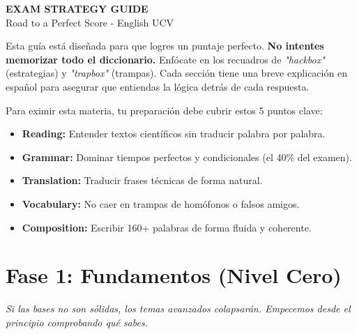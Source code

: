 \documentclass[11pt,a4paper]{article}
\begin{document}
\begin{center}
    {\Huge \color{primary} \textbf{EXAM STRATEGY GUIDE}} \\
    \vspace{0.2cm}
    {\large \color{secondary} Road to a Perfect Score - English UCV}
\end{center}

\vspace{0.5cm}

\begin{tcolorbox}[colback=blue!5,colframe=primary,title=\faInfoCircle \quad CÓMO USAR ESTA GUÍA (Spanish Intro)]
    Esta guía está diseñada para que logres un puntaje perfecto. \textbf{No intentes memorizar todo el diccionario.} Enfócate en los recuadros de \textit{"hackbox"} (estrategias) y \textit{"trapbox"} (trampas). Cada sección tiene una breve explicación en español para asegurar que entiendas la lógica detrás de cada respuesta.
\end{tcolorbox}

\begin{tcolorbox}[colback=gray!5,colframe=gray!50,title=\faBullseye \quad OBJECTIVES - LO QUE DEBES LOGRAR]
    Para eximir esta materia, tu preparación debe cubrir estos 5 puntos clave:
    \begin{itemize}[noitemsep]
        \item \textbf{Reading:} Entender textos científicos sin traducir palabra por palabra.
        \item \textbf{Grammar:} Dominar tiempos perfectos y condicionales (el 40\% del examen).
        \item \textbf{Translation:} Traducir frases técnicas de forma natural.
        \item \textbf{Vocabulary:} No caer en trampas de homófonos o falsos amigos.
        \item \textbf{Composition:} Escribir 160+ palabras de forma fluida y coherente.
    \end{itemize}
\end{tcolorbox}

\vspace{0.3cm}

\section{Fase 1: Fundamentos (Nivel Cero)}
\textit{Si las bases no son sólidas, los temas avanzados colapsarán. Empecemos desde el principio comprobando qué sabes.}
\end{document}
